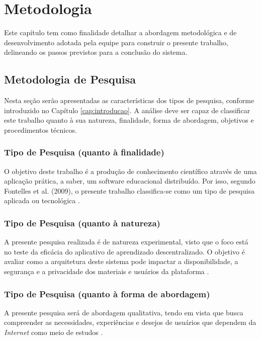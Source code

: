 \chapter[Metodologia]{Metodologia}
\label{cap:metodologia}

Este capítulo tem como finalidade detalhar a abordagem metodológica e de desenvolvimento adotada pela equipe para construir o presente trabalho, delineando os passos previstos para a conclusão do sistema.

\section{Metodologia de Pesquisa}

Nesta seção serão apresentadas as características dos tipos de pesquisa, conforme introduzido no Capítulo \ref{cap:introducao}. A análise deve ser capaz de classificar este trabalho quanto à sua natureza, finalidade, forma de abordagem, objetivos e procedimentos técnicos.

\subsection{Tipo de Pesquisa (quanto à finalidade)}
O objetivo deste trabalho é a produção de conhecimento científico através de uma aplicação prática, a saber, um software educacional distribuído. Por isso, segundo Fontelles et al. (2009), o presente trabalho classifica-se como um tipo de pesquisa aplicada ou tecnológica \cite{fontelles2009}.

\subsection{Tipo de Pesquisa (quanto à natureza)}
A presente pesquisa realizada é de natureza experimental, visto que o foco está no teste da eficácia do aplicativo de aprendizado descentralizado. O objetivo é avaliar como a arquitetura deste sistema pode impactar a disponibilidade, a segurança e a privacidade dos materiais e usuários da plataforma \cite{fontelles2009}.

\subsection{Tipo de Pesquisa (quanto à forma de abordagem)}
A presente pesquisa será de abordagem qualitativa, tendo em vista que busca compreender as necessidades, experiências e desejos de usuários que dependem da \textit{Internet} como meio de estudos \cite{fontelles2009}.

